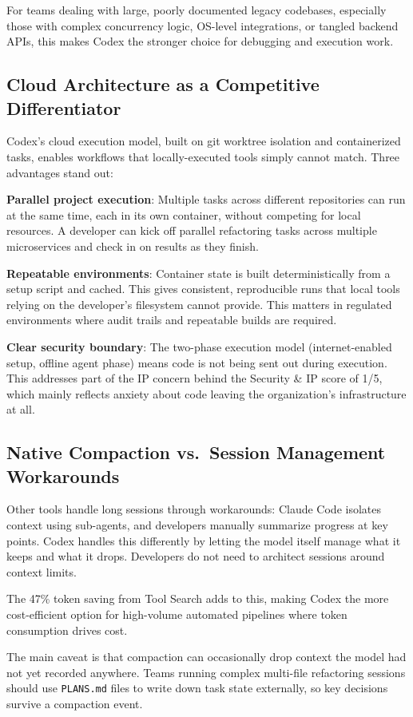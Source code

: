 \documentclass[conference]{IEEEtran}
\begin{document}
For teams dealing with large, poorly documented legacy codebases, especially those with complex concurrency logic, OS-level integrations, or tangled backend APIs, this makes Codex the stronger choice for debugging and execution work.

\subsection{Cloud Architecture as a Competitive Differentiator}
Codex's cloud execution model, built on git worktree isolation and containerized tasks, enables workflows that locally-executed tools simply cannot match. Three advantages stand out:

\textbf{Parallel project execution}: Multiple tasks across different repositories can run at the same time, each in its own container, without competing for local resources. A developer can kick off parallel refactoring tasks across multiple microservices and check in on results as they finish.

\textbf{Repeatable environments}: Container state is built deterministically from a setup script and cached. This gives consistent, reproducible runs that local tools relying on the developer's filesystem cannot provide. This matters in regulated environments where audit trails and repeatable builds are required.

\textbf{Clear security boundary}: The two-phase execution model (internet-enabled setup, offline agent phase) means code is not being sent out during execution. This addresses part of the IP concern behind the Security \& IP score of 1/5, which mainly reflects anxiety about code leaving the organization's infrastructure at all.

\subsection{Native Compaction vs.\ Session Management Workarounds}
Other tools handle long sessions through workarounds: Claude Code isolates context using sub-agents, and developers manually summarize progress at key points. Codex handles this differently by letting the model itself manage what it keeps and what it drops. Developers do not need to architect sessions around context limits.

The 47\% token saving from Tool Search adds to this, making Codex the more cost-efficient option for high-volume automated pipelines where token consumption drives cost.

The main caveat is that compaction can occasionally drop context the model had not yet recorded anywhere. Teams running complex multi-file refactoring sessions should use \texttt{PLANS.md} files to write down task state externally, so key decisions survive a compaction event.
\end{document}
